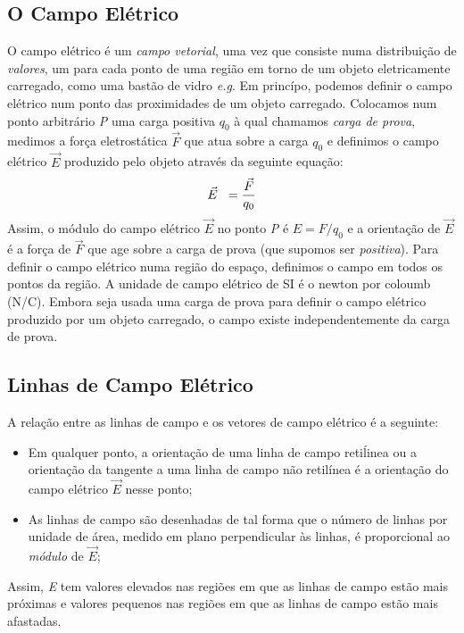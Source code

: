 \documentclass{article}
\begin{document}
\subsection{O Campo Elétrico}
O campo elétrico é um \textit{campo vetorial}, uma vez que consiste numa distribuição de \textit{valores}, um para cada ponto de uma região em torno de um objeto eletricamente carregado, como uma bastão de vidro \textit{e.g}. Em princípo, podemos definir o campo elétrico num ponto das proximidades de um objeto carregado. Colocamos num ponto arbitrário \textit{P} uma carga positiva \textit{$q_0$} à qual chamamos \textit{carga de prova}, medimos a força eletrostática \(\vec{F}\) que atua sobre a carga \textit{$q_0$} e definimos o campo elétrico \(\vec{E}\) produzido pelo objeto através da seguinte equação:
\newline
\[\vec{E} \hspace{0.2cm}= \frac{\vec{F}}{q_0}\]
\newline
Assim, o módulo do campo elétrico \(\vec{E}\) no ponto \textit{P} é \(\textit{E} = \textit{F/}\textit{$q_0$}\) e a orientação de \(\vec{E}\) é a força de \(\vec{F}\) que age sobre a carga de prova (que supomos ser \textit{positiva}). Para definir o campo elétrico numa região do espaço, definimos o campo em todos os pontos da região. A unidade de campo elétrico de SI é o newton por coloumb (N/C).
\newline
Embora seja usada uma carga de prova para definir o campo elétrico produzido por um objeto carregado, o campo existe independentemente da carga de prova.
\subsection{Linhas de Campo Elétrico}
A relação entre as linhas de campo e os vetores de campo elétrico é a seguinte:
\begin{itemize}
    \item Em qualquer ponto, a orientação de uma linha de campo retiĺinea ou a orientação da tangente a uma linha de campo não retilínea é a orientação do campo elétrico \(\vec{E}\) nesse ponto;
    \item As linhas de campo são desenhadas de tal forma que o número de linhas por unidade de área, medido em plano perpendicular às linhas, é proporcional ao \textit{módulo} de \(\vec{E}\);
\end{itemize}
Assim, \textit{E} tem valores elevados nas regiões em que as linhas de campo estão mais próximas e valores pequenos nas regiões em que as linhas de campo estão mais afastadas.
\end{document}
